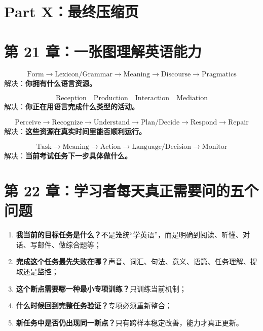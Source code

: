 \documentclass[11pt,a4paper]{ctexart}
\newcommand{\kw}[1]{\textbf{#1}}
\begin{document}
\newpage
\section{Part X：最终压缩页}

\section{第 21 章：一张图理解英语能力}

\begin{corebox}[语言资源]
\[
\boxed{
\text{Form}
\rightarrow
\text{Lexicon/Grammar}
\rightarrow
\text{Meaning}
\rightarrow
\text{Discourse}
\rightarrow
\text{Pragmatics}
}
\]
解决：\kw{你拥有什么语言资源。}
\end{corebox}

\begin{statebox}[语言活动]
\[
\boxed{
\text{Reception}
\quad
\text{Production}
\quad
\text{Interaction}
\quad
\text{Mediation}
}
\]
解决：\kw{你正在用语言完成什么类型的活动。}
\end{statebox}

\begin{exam}[在线控制]
\[
\boxed{
\text{Perceive}
\rightarrow
\text{Recognize}
\rightarrow
\text{Understand}
\rightarrow
\text{Plan/Decide}
\rightarrow
\text{Respond}
\rightarrow
\text{Repair}
}
\]
解决：\kw{这些资源在真实时间里能否顺利运行。}
\end{exam}

\begin{bridge}[考试控制]
\[
\boxed{
\text{Task}
\rightarrow
\text{Meaning}
\rightarrow
\text{Action}
\rightarrow
\text{Language/Decision}
\rightarrow
\text{Monitor}
}
\]
解决：\kw{当前考试任务下一步具体做什么。}
\end{bridge}

\section{第 22 章：学习者每天真正需要问的五个问题}
\begin{enumerate}
  \item \kw{我当前的目标任务是什么？}不是笼统“学英语”，而是明确到阅读、听懂、对话、写邮件、做综合题等；
  \item \kw{完成这个任务最先失败在哪？}声音、词汇、句法、意义、语篇、任务理解、提取还是监控；
  \item \kw{这个断点需要哪一种最小专项训练？}只训练当前机制；
  \item \kw{什么时候回到完整任务验证？}专项必须重新整合；
  \item \kw{新任务中是否仍出现同一断点？}只有跨样本稳定改善，能力才真正更新。
\end{enumerate}
\end{document}
